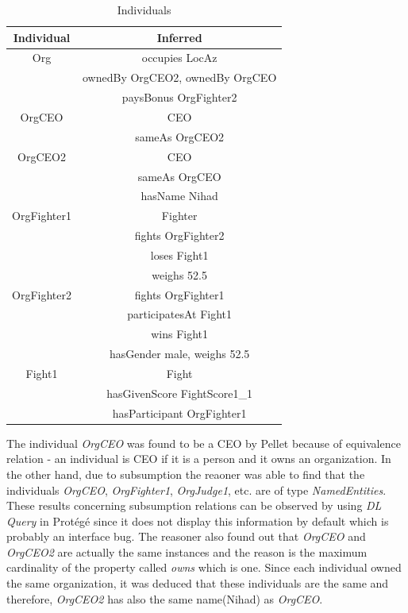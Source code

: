 \documentclass[a4paper]{article}
\begin{document}
\begin{table}[H]
	\centering
	\begin{tabular}{|c|c|}
		\hline
		\textbf{Individual} & \textbf{Inferred} \\
		\hline
		Org & occupies LocAz \\
			& ownedBy OrgCEO2, ownedBy OrgCEO \\
			& paysBonus OrgFighter2 \\
		\hline
		OrgCEO & CEO \\
			& sameAs OrgCEO2 \\
		\hline
		OrgCEO2 & CEO \\ 
			& sameAs OrgCEO \\
			& hasName Nihad \\
		\hline
		OrgFighter1 & Fighter \\
			& fights OrgFighter2 \\
			& loses Fight1 \\
			& weighs 52.5 \\
		\hline
		OrgFighter2 & fights OrgFighter1 \\
			& participatesAt Fight1 \\
			& wins Fight1 \\
			& hasGender male, weighs 52.5 \\
		\hline
		Fight1 & Fight \\
			& hasGivenScore FightScore1\_1 \\
			& hasParticipant OrgFighter1 \\
		\hline
	\end{tabular}
	\caption{Individuals}
	\label{tab:inferred}
\end{table}

The individual \textit{OrgCEO} was found to be a CEO by Pellet because of equivalence relation - an individual is CEO if it is a person and it owns an organization. In the other hand, due to subsumption 
the reaoner was able to find that the individuals \textit{OrgCEO}, \textit{OrgFighter1}, \textit{OrgJudge1}, etc. are of type \textit{NamedEntities}. These results concerning subsumption relations can 
be observed by using \textit{DL Query} in Prot\'eg\'e since it does not display this information by default which is probably an interface bug. The reasoner also found out that \textit{OrgCEO} and 
\textit{OrgCEO2} are actually the same instances and the reason is the maximum cardinality of the property called \textit{owns} which is one. Since each individual owned the same organization, it was 
deduced that these individuals are the same and therefore, \textit{OrgCEO2} has also the same name(Nihad) as \textit{OrgCEO}.
\end{document}
